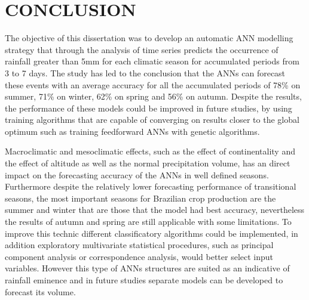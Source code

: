 \chapter{CONCLUSION}
\label{cap:cap4}
\vspace{-2cm}

The objective of this dissertation was to develop an automatic ANN modelling strategy that through the analysis of time series predicts the occurrence of rainfall greater than 5mm for each climatic season for accumulated periods from 3 to 7 days. The study has led to the conclusion that the ANNs can forecast these events with an average accuracy for all the accumulated periods of 78\%  on summer,  71\% on winter, 62\% on spring  and 56\% on autumn. Despite the results, the performance of these models could be improved in future studies, by using training algorithms that are capable of converging on results closer to the global optimum such as training feedforward ANNs with genetic algorithms.

Macroclimatic and mesoclimatic effects, such as the effect of continentality and the effect of altitude as well as the normal precipitation volume, has an direct impact on the forecasting accuracy of the ANNs in well defined seasons. Furthermore despite the relatively lower forecasting performance of transitional seasons, the most important seasons for Brazilian crop production are the summer and winter that are those that the model had best accuracy, nevertheless the results of autumn and spring are still applicable with some limitations. To improve this technic different classificatory algorithms could be implemented, in addition exploratory multivariate statistical procedures, such as principal component analysis or correspondence analysis, would better select input variables. However this type of ANNs structures are suited as an indicative of rainfall eminence and in future studies separate models can be developed to forecast its volume.
